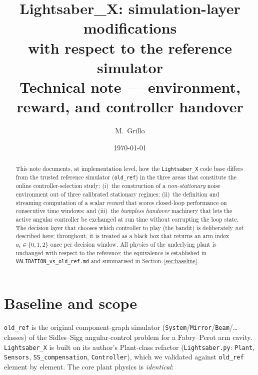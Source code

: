 \documentclass[11pt,a4paper]{article}
\title{\textbf{Lightsaber\_X: simulation-layer modifications\\ with respect to the reference simulator}\\[4pt]
\large Technical note --- environment, reward, and controller handover}
\author{M.~Grillo}
\date{\today}
\newcommand{\code}[1]{\texttt{#1}}
\begin{document}
\maketitle

\begin{abstract}
\noindent
This note documents, at implementation level, how the \code{Lightsaber\_X} code base
differs from the trusted reference simulator (\code{old\_ref}) in the three areas that
constitute the online controller-selection study: (i)~the construction of a
\emph{non-stationary} noise environment out of three calibrated stationary regimes;
(ii)~the definition and streaming computation of a scalar \emph{reward} that scores
closed-loop performance on consecutive time windows; and (iii)~the \emph{bumpless
handover} machinery that lets the active angular controller be exchanged at run time
without corrupting the loop state. The decision layer that chooses which controller to
play (the bandit) is deliberately \emph{not} described here; throughout, it is treated as
a black box that returns an arm index $a_t \in \{0,1,2\}$ once per decision window.
All physics of the underlying plant is unchanged with respect to the reference; the
equivalence is established in \code{VALIDATION\_vs\_old\_ref.md} and summarised in
Section~\ref{sec:baseline}.
\end{abstract}

\tableofcontents

\section{Baseline and scope}
\label{sec:baseline}

\code{old\_ref} is the original component-graph simulator
(\code{System}/\code{Mirror}/\code{Beam}/\ldots{} classes) of the Sidles--Sigg
angular-control problem for a Fabry--Perot arm cavity. \code{Lightsaber\_X} is built on
its author's Plant-class refactor (\code{Lightsaber.py}: \code{Plant},
\code{Sensors}, \code{SS\_compensation}, \code{Controller}), which we validated against
\code{old\_ref} element by element. The core plant physics is \emph{identical}:
\end{document}
